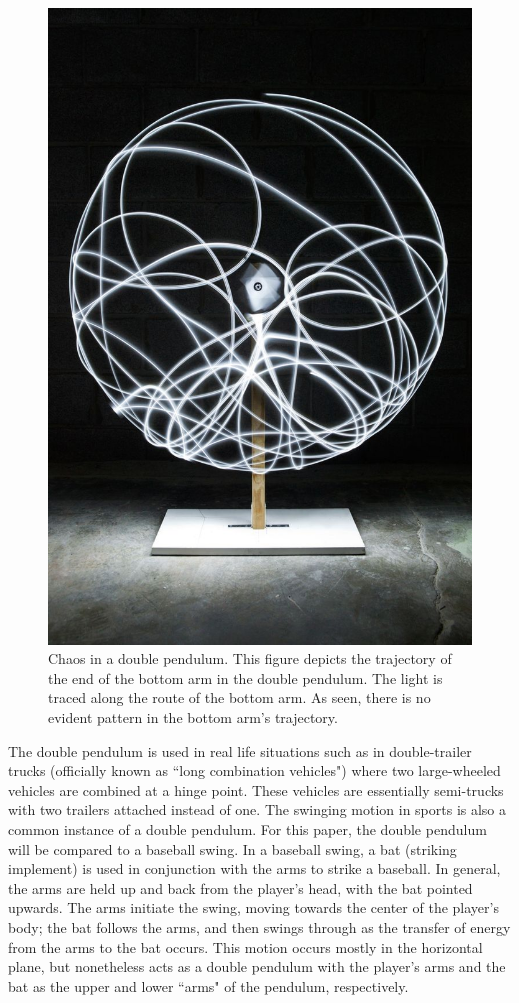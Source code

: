 \documentclass[%
 aip,
 amsmath,amssymb,
 reprint,%
 floatfix,%
]{revtex4-1}
\begin{document}
\begin{figure}
	\centering
	\includegraphics[scale=0.25]{lights.jpg}
	\caption{Chaos in a double pendulum. This figure depicts the trajectory of the end of the bottom arm in the double pendulum. The light is traced along the route of the bottom arm. As seen, there is no evident pattern in the bottom arm's trajectory.}
\end{figure}

The double pendulum is used in real life situations such as in double-trailer trucks (officially known as ``long combination vehicles") where two large-wheeled vehicles are combined at a hinge point. These vehicles are essentially semi-trucks with two trailers attached instead of one. The swinging motion in sports is also a common instance of a double pendulum. For this paper, the double pendulum will be compared to a baseball swing. In a baseball swing, a bat (striking implement) is used in conjunction with the arms to strike a baseball. In general, the arms are held up and back from the player's head, with the bat pointed upwards. The arms initiate the swing, moving towards the center of the player's body; the bat follows the arms, and then swings through as the transfer of energy from the arms to the bat occurs. This motion occurs mostly in the horizontal plane, but nonetheless acts as a double pendulum with the player's arms and the bat as the upper and lower ``arms" of the pendulum, respectively.
\end{document}
